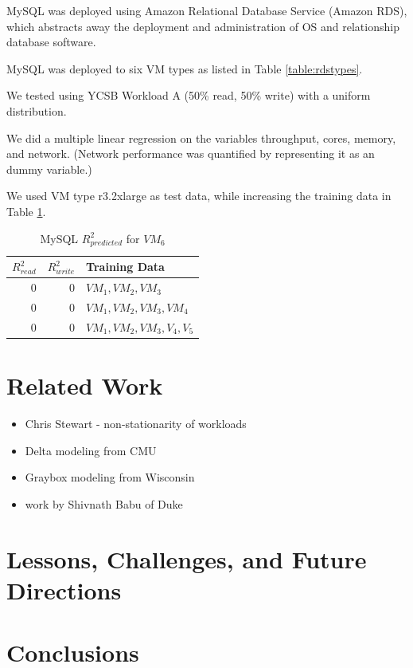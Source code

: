 \documentclass{acm_proc_article-sp}
\begin{document}
MySQL was deployed using Amazon Relational Database Service (Amazon RDS), which abstracts away the deployment and administration of OS and relationship database software.

MySQL was deployed to six VM types as listed in Table \ref{table:rdstypes}.

We tested using YCSB Workload A (50\% read, 50\% write) with a uniform distribution.

We did a multiple linear regression on the variables throughput, cores, memory, and network.  (Network performance was quantified by representing it as an dummy variable.)

We used VM type r3.2xlarge as test data, while increasing the training data in Table \ref{table:mysql}.

\begin{table}
\centering
\caption{MySQL $R_{predicted}^2$ for $VM_6$}
\begin{tabular}{|r|r|l|} \hline
$R_{read}^2$&$R_{write}^2$&Training Data\\ \hline
0 & 0& $VM_1,VM_2,VM_3$\\ \hline
0 & 0& $VM_1,VM_2,VM_3,VM_4$\\ \hline
0 & 0& $VM_1,VM_2,VM_3,V_4,V_5$\\ \hline
\hline\end{tabular}
\label{table:mysql}
\end{table}

\section{Related Work}

\begin{itemize}
   \item Chris Stewart - non-stationarity of workloads
   \item Delta modeling from CMU
   \item Graybox modeling from Wisconsin
   \item work by Shivnath Babu of Duke
\end{itemize}


\section{Lessons, Challenges, and Future Directions}

\section{Conclusions}



%

%
%

\balancecolumns
\end{document}
